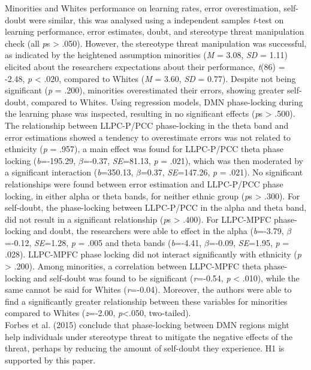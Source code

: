 \documentclass[
  stu,floatsintext]{apa7}
\begin{document}
Minorities and Whites performance on learning rates, error overestimation, self-doubt were similar, this was analysed using a independent samples \emph{t}-test on learning performance, error estimates, doubt, and stereotype threat manipulation check (all \emph{p}s \textgreater{} .050).
However, the stereotype threat manipulation was successful, as indicated by the heightened assumption minorities (\emph{M} = 3.08, \emph{SD} = 1.11) elicited about the researchers expectations about their performance, \emph{t}(86) = -2.48, \emph{p} \textless{} .020, compared to Whites (\emph{M} = 3.60, \emph{SD} = 0.77).
Despite not being significant (\emph{p} = .200), minorities overestimated their errors, showing greater self-doubt, compared to Whites.
Using regression models, DMN phase-locking during the learning phase was inspected, resulting in no significant effects (\emph{p}s \textgreater{} .500).
The relationship between LLPC-P/PCC phase-locking in the theta band and error estimations showed a tendency to overestimate errors was not related to ethnicity (\emph{p} = .957), a main effect was found for LLPC-P/PCC theta phase locking (\emph{b}=-195.29, \(\beta\)=-0.37, \emph{SE}=81.13, \emph{p} = .021), which was then moderated by a significant interaction (\emph{b}=350.13, \(\beta\)=0.37, \emph{SE}=147.26, \emph{p} = .021).
No significant relationships were found between error estimation and LLPC-P/PCC phase locking, in either alpha or theta bands, for neither ethnic group (\emph{p}s \textgreater{} .300).
For self-doubt, the phase-locking between LLPC-P/PCC in the alpha and theta band, did not result in a significant relationship (\emph{p}s \textgreater{} .400).
For LLPC-MPFC phase-locking and doubt, the researchers were able to effect in the alpha (\emph{b}=-3.79, \(\beta\)=-0.12, \emph{SE}=1.28, \emph{p} = .005 and theta bands (\emph{b}=-4.41, \(\beta\)=-0.09, \emph{SE}=1.95, \emph{p} = .028).
LLPC-MPFC phase locking did not interact significantly with ethnicity (\emph{p} \textgreater{} .200).
Among minorities, a correlation between LLPC-MPFC theta phase-locking and self-doubt was found to be significant (\emph{r}=-0.54, \emph{p} \textless{} .010), while the same cannot be said for Whites (\emph{r}=-0.04).
Moreover, the authors were able to find a significantly greater relationship between these variables for minorities compared to Whites (\emph{z}=-2.00, \emph{p}\textless.050, two-tailed).\\
Forbes et al. (2015) conclude that phase-locking between DMN regions might help individuals under stereotype threat to mitigate the negative effects of the threat, perhaps by reducing the amount of self-doubt they experience.
H1 is supported by this paper.
\end{document}
